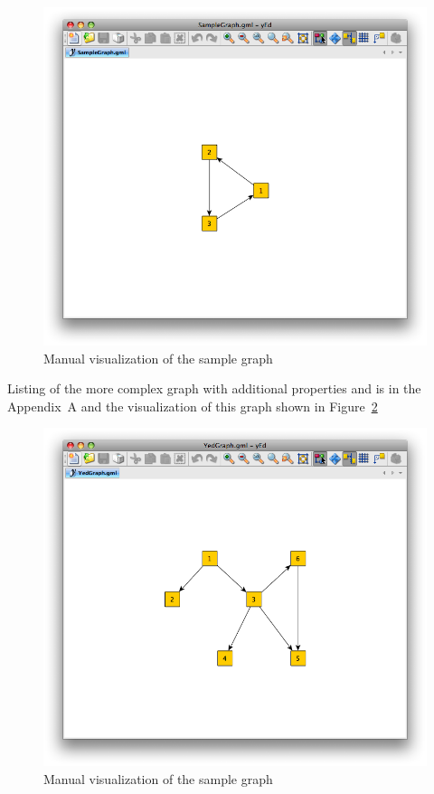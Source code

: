 \begin{figure}[h!]
\centering
\includegraphics[scale=0.5]{pictures/SampleGraph.png}
\caption{Manual visualization of the sample graph}
\label{fig:sample_graph_yed_vis}
\end{figure}

Listing of the more complex graph with additional properties and is in the Appendix~A and the visualization of this graph shown in Figure~\ref{fig:yed_graph_vis}

\begin{figure}[h!]
\centering
\includegraphics[scale=0.5]{pictures/YedGraph.png}
\caption{Manual visualization of the sample graph}
\label{fig:yed_graph_vis}
\end{figure}

